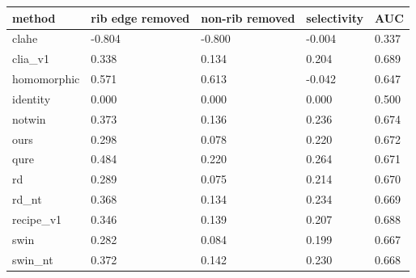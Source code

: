 \begin{tabular}{lllll}
\toprule
method & rib edge removed & non-rib removed & selectivity & AUC \\
\midrule
clahe & -0.804 & -0.800 & -0.004 & 0.337 \\
clia\_v1 & 0.338 & 0.134 & 0.204 & 0.689 \\
homomorphic & 0.571 & 0.613 & -0.042 & 0.647 \\
identity & 0.000 & 0.000 & 0.000 & 0.500 \\
notwin & 0.373 & 0.136 & 0.236 & 0.674 \\
ours & 0.298 & 0.078 & 0.220 & 0.672 \\
qure & 0.484 & 0.220 & 0.264 & 0.671 \\
rd & 0.289 & 0.075 & 0.214 & 0.670 \\
rd\_nt & 0.368 & 0.134 & 0.234 & 0.669 \\
recipe\_v1 & 0.346 & 0.139 & 0.207 & 0.688 \\
swin & 0.282 & 0.084 & 0.199 & 0.667 \\
swin\_nt & 0.372 & 0.142 & 0.230 & 0.668 \\
\bottomrule
\end{tabular}
